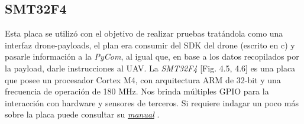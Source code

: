 \documentclass[12pt]{article}
\begin{document}
\subsection{SMT32F4}
Esta placa se utilizó con el objetivo de realizar pruebas tratándola como una interfaz drone-payloads, el plan era consumir del SDK del drone (escrito en c) y pasarle información a la \textit{PyCom}, al igual que, en base a los datos recopilados por la payload, darle instrucciones al UAV.
La \textit{SMT32F4} [Fig. 4.5, 4.6] es una placa que posee un procesador Cortex M4, con arquitectura ARM de 32-bit y una frecuencia de operación de 180 MHz. Nos brinda múltiples GPIO para la interacción con hardware y sensores de terceros. Si requiere indagar un poco más sobre la placa puede consultar su \href{https://drive.google.com/file/d/182H9i1qmJ2UCbynztxymEA3nfmx_eGrk/view?usp=share_link}{\textit{manual}} \cite{smt}.
\end{document}
